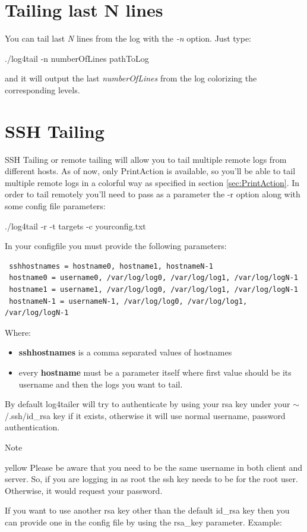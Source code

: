 \section{Tailing last N lines}
You can tail last \emph{N} lines from the log with the \emph{-n} option. Just type:
\begin{cmd}
 ./log4tail -n numberOfLines pathToLog
\end{cmd}
and it will output the last \emph{numberOfLines} from the log colorizing the
corresponding levels.

\section{SSH Tailing}
SSH Tailing or remote tailing will allow you to tail multiple remote logs from
different hosts. As of now, only PrintAction is available, so you'll be able to
tail multiple remote logs in a colorful way as specified in section
\ref{sec:PrintAction}. In order to tail remotely you'll need to pass as a
parameter the -r option along with some config file parameters:

\begin{cmd}
 ./log4tail -r -t targets -c yourconfig.txt
\end{cmd}
In your configfile you must provide the following parameters:

\begin{config}
\begin{verbatim}
 sshhostnames = hostname0, hostname1, hostnameN-1
 hostname0 = username0, /var/log/log0, /var/log/log1, /var/log/logN-1
 hostname1 = username1, /var/log/log0, /var/log/log1, /var/log/logN-1
 hostnameN-1 = usernameN-1, /var/log/log0, /var/log/log1, /var/log/logN-1
\end{verbatim}
\end{config}

\noindent
Where:
\begin{itemize}
\item \textbf{sshhostnames} is a comma separated values of hostnames
\item every \textbf{hostname} must be a parameter itself where first 
value should be its username and then the logs you want to tail.
\end{itemize}

By default log4tailer will try to authenticate by using your rsa key under your
$\sim$/.ssh/id\_rsa key if it exists, otherwise it will use normal username, password
authentication. 

\begin {bclogo}[logo =\bcinfo, barre = none,noborder = true]{Note}
\begin {gbar}{yellow}
Please be aware that you need to be the same username
in both client and server. So, if you are logging in as root the ssh key needs
to be for the root user. Otherwise, it would request your password.
\end{gbar}
\end{bclogo}
If you want to use another rsa key other than the default
id\_rsa key then you can provide one in the config file by using the rsa\_key
parameter. Example:

